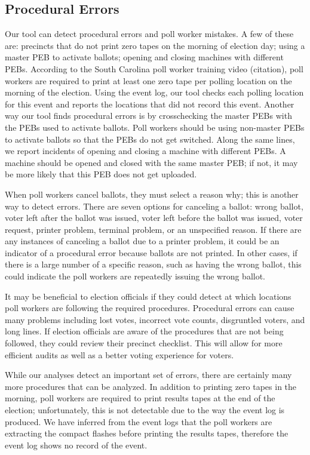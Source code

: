 \subsection{Procedural Errors}
Our tool can detect procedural errors and poll worker mistakes.  A few of these are: precincts that do not print zero tapes on the morning of election day; using a master PEB to activate ballots; opening and closing machines with different PEBs.  According to the South Carolina poll worker training video (citation), poll workers are required to print at least one zero tape per polling location on the morning of the election.  Using the event log, our tool checks each polling location for this event and reports the locations that did not record this event.  Another way our tool finds procedural errors is by crosschecking the master PEBs with the PEBs used to activate ballots.  Poll workers should be using non-master PEBs to activate ballots so that the PEBs do not get switched.  Along the same lines, we report incidents of opening and closing a machine with different PEBs.  A machine should be opened and closed with the same master PEB; if not, it may be more likely that this PEB does not get uploaded.   

When poll workers cancel ballots, they must select a reason why; this is another way to detect errors.  There are seven options for canceling a ballot: wrong ballot, voter left after the ballot was issued, voter left before the ballot was issued, voter request, printer problem, terminal problem, or an unspecified reason.  If there are any instances of canceling a ballot due to a printer problem, it could be an indicator of a procedural error because ballots are not printed.  In other cases, if there is a large number of a specific reason, such as having the wrong ballot, this could indicate the poll workers are repeatedly issuing the wrong ballot.  

It may be beneficial to election officials if they could detect at which locations poll workers are following the required procedures.  Procedural errors can cause many problems including lost votes, incorrect vote counts, disgruntled voters, and long lines.  If election officials are aware of the procedures that are not being followed, they could review their precinct checklist.  This will allow for more efficient audits as well as a better voting experience for voters.  

While our analyses detect an important set of errors, there are certainly many more procedures that can be analyzed.  In addition to printing zero tapes in the morning, poll workers are required to print results tapes at the end of the election; unfortunately, this is not detectable due to the way the event log is produced.  We have inferred from the event logs that the poll workers are extracting the compact flashes before printing the results tapes, therefore the event log shows no record of the event.  

